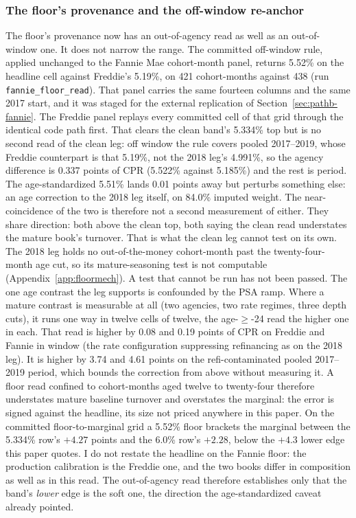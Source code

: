\documentclass[12pt]{article}
\begin{document}
\subsubsection{The floor's provenance and the off-window re-anchor}

The floor's provenance now has an out-of-agency read as well as an out-of-window one. It does not narrow the range. The committed off-window rule, applied unchanged to the Fannie Mae cohort-month panel, returns 5.52\% on the headline cell against Freddie's 5.19\%, on 421 cohort-months against 438 (run \texttt{fannie\_floor\_read}). That panel carries the same fourteen columns and the same 2017 start, and it was staged for the external replication of Section~\ref{sec:pathb-fannie}. The Freddie panel replays every committed cell of that grid through the identical code path first. That clears the clean band's 5.334\% top but is no second read of the clean leg: off window the rule covers pooled 2017--2019, whose Freddie counterpart is that 5.19\%, not the 2018 leg's 4.991\%, so the agency difference is 0.337 points of CPR (5.522\% against 5.185\%) and the rest is period. The age-standardized 5.51\% lands 0.01 points away but perturbs something else: an age correction to the 2018 leg itself, on 84.0\% imputed weight. The near-coincidence of the two is therefore not a second measurement of either. They share direction: both above the clean top, both saying the clean read understates the mature book's turnover. That is what the clean leg cannot test on its own. The 2018 leg holds no out-of-the-money cohort-month past the twenty-four-month age cut, so its mature-seasoning test is not computable (Appendix~\ref{app:floormech}). A test that cannot be run has not been passed. The one age contrast the leg supports is confounded by the PSA ramp. Where a mature contrast is measurable at all (two agencies, two rate regimes, three depth cuts), it runs one way in twelve cells of twelve, the age-$\geq$-24 read the higher one in each. That read is higher by 0.08 and 0.19 points of CPR on Freddie and Fannie in window (the rate configuration suppressing refinancing as on the 2018 leg). It is higher by 3.74 and 4.61 points on the refi-contaminated pooled 2017--2019 period, which bounds the correction from above without measuring it. A floor read confined to cohort-months aged twelve to twenty-four therefore understates mature baseline turnover and overstates the marginal: the error is signed against the headline, its size not priced anywhere in this paper. On the committed floor-to-marginal grid a 5.52\% floor brackets the marginal between the 5.334\% row's $+4.27$ points and the 6.0\% row's $+2.28$, below the $+4.3$ lower edge this paper quotes. I do not restate the headline on the Fannie floor: the production calibration is the Freddie one, and the two books differ in composition as well as in this read. The out-of-agency read therefore establishes only that the band's \emph{lower} edge is the soft one, the direction the age-standardized caveat already pointed.
\end{document}
